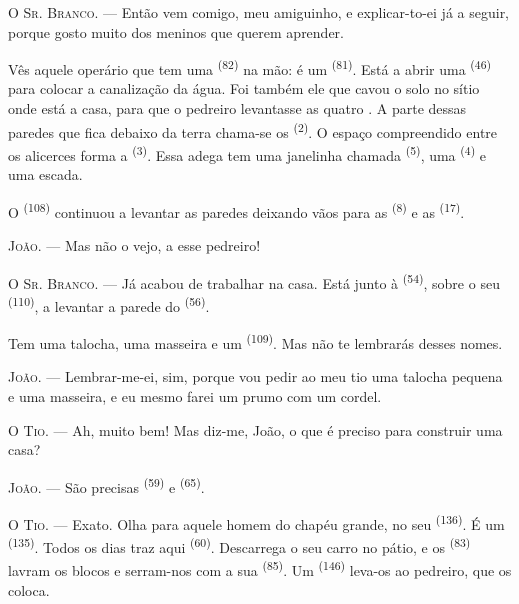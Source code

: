 \VUsaut{3.0mm}

\textsc{O Sr. Branco}. --- Então vem comigo, meu amiguinho, e explicar-to-ei
já a seguir, porque gosto muito dos meninos que querem aprender.

Vês aquele operário que tem uma  \textsuperscript{(82)} na mão: é um
 \textsuperscript{(81)}. Está a abrir uma 
\textsuperscript{(46)} para colocar a canalização da água. Foi também ele que
cavou o solo no sítio onde está a casa, para que o pedreiro levantasse as
quatro . A parte dessas paredes que fica debaixo da terra
chama-se os  \textsuperscript{(2)}. O espaço compreendido entre
os alicerces forma a  \textsuperscript{(3)}. Essa adega tem uma
janelinha chamada  \textsuperscript{(5)}, uma 
\textsuperscript{(4)} e uma escada.

O  \textsuperscript{(108)} continuou a levantar as paredes
deixando vãos para as  \textsuperscript{(8)} e as 
\textsuperscript{(17)}.

\textsc{João}. --- Mas não o vejo, a esse pedreiro!

\textsc{O Sr. Branco}. --- Já acabou de trabalhar na casa. Está junto à
 \textsuperscript{(54)}, sobre o seu 
\textsuperscript{(110)}, a levantar a parede do 
\textsuperscript{(56)}.

Tem uma talocha, uma masseira e um  \textsuperscript{(109)}. Mas não
te lembrarás desses nomes.

\textsc{João}. --- Lembrar-me-ei, sim, porque vou pedir ao meu tio uma
talocha pequena e uma masseira, e eu mesmo farei um prumo com um cordel.

\VUsaut{3.0mm}
\VUsaut{3.0mm}

\textsc{O Tio}. --- Ah, muito bem! Mas diz-me, João, o que é preciso para
construir uma casa?

\textsc{João}. --- São precisas  \textsuperscript{(59)} e
 \textsuperscript{(65)}.

\textsc{O Tio}. --- Exato. Olha para aquele homem do chapéu grande, no seu
 \textsuperscript{(136)}. É um 
\textsuperscript{(135)}. Todos os dias traz aqui 
\textsuperscript{(60)}. Descarrega o seu carro no pátio, e os 
\textsuperscript{(83)} lavram os blocos e serram-nos com a sua  \textsuperscript{(85)}. Um  \textsuperscript{(146)} leva-os ao
pedreiro, que os coloca.

